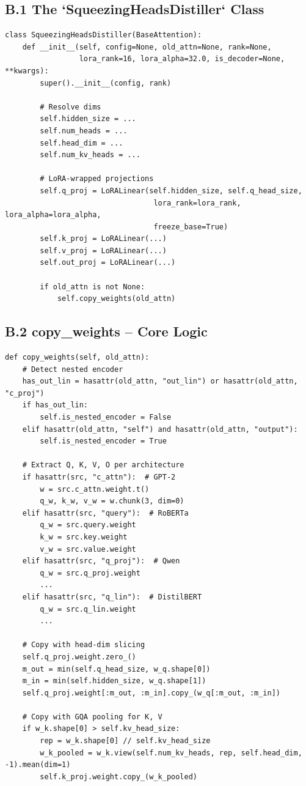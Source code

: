 \subsection{B.1 The `SqueezingHeadsDistiller` Class}

\begin{lstlisting}
class SqueezingHeadsDistiller(BaseAttention):
    def __init__(self, config=None, old_attn=None, rank=None,
                 lora_rank=16, lora_alpha=32.0, is_decoder=None, **kwargs):
        super().__init__(config, rank)
        
        # Resolve dims
        self.hidden_size = ...
        self.num_heads = ...
        self.head_dim = ...
        self.num_kv_heads = ...
        
        # LoRA-wrapped projections
        self.q_proj = LoRALinear(self.hidden_size, self.q_head_size,
                                  lora_rank=lora_rank, lora_alpha=lora_alpha,
                                  freeze_base=True)
        self.k_proj = LoRALinear(...)
        self.v_proj = LoRALinear(...)
        self.out_proj = LoRALinear(...)
        
        if old_attn is not None:
            self.copy_weights(old_attn)
\end{lstlisting}

\subsection{B.2 copy\_weights -- Core Logic}

\begin{lstlisting}
def copy_weights(self, old_attn):
    # Detect nested encoder
    has_out_lin = hasattr(old_attn, "out_lin") or hasattr(old_attn, "c_proj")
    if has_out_lin:
        self.is_nested_encoder = False
    elif hasattr(old_attn, "self") and hasattr(old_attn, "output"):
        self.is_nested_encoder = True
    
    # Extract Q, K, V, O per architecture
    if hasattr(src, "c_attn"):  # GPT-2
        w = src.c_attn.weight.t()
        q_w, k_w, v_w = w.chunk(3, dim=0)
    elif hasattr(src, "query"):  # RoBERTa
        q_w = src.query.weight
        k_w = src.key.weight
        v_w = src.value.weight
    elif hasattr(src, "q_proj"):  # Qwen
        q_w = src.q_proj.weight
        ...
    elif hasattr(src, "q_lin"):  # DistilBERT
        q_w = src.q_lin.weight
        ...
    
    # Copy with head-dim slicing
    self.q_proj.weight.zero_()
    m_out = min(self.q_head_size, w_q.shape[0])
    m_in = min(self.hidden_size, w_q.shape[1])
    self.q_proj.weight[:m_out, :m_in].copy_(w_q[:m_out, :m_in])
    
    # Copy with GQA pooling for K, V
    if w_k.shape[0] > self.kv_head_size:
        rep = w_k.shape[0] // self.kv_head_size
        w_k_pooled = w_k.view(self.num_kv_heads, rep, self.head_dim, -1).mean(dim=1)
        self.k_proj.weight.copy_(w_k_pooled)
\end{lstlisting}

